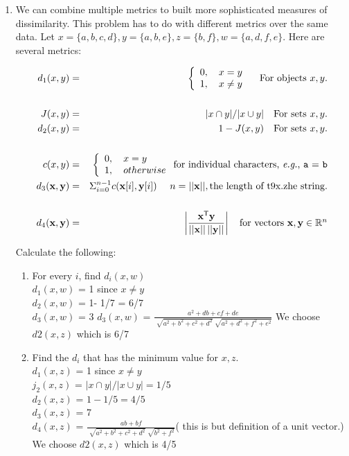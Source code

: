 \documentclass{article}
\begin{document}
\begin{enumerate}
\item  We can combine multiple metrics to built more sophisticated measures of dissimilarity. This problem has to do with different metrics over the same data.  Let  $x = \{a,b,c,d\}, y = \{a, b, e\}, z = \{b, f\}, w = \{a,d,f,e\}$.  Here are several metrics:

 \begin{eqnarray*}
 d_1(x,y) &=& \left\{\begin{array}{l} 0,\ \ \ x = y \\ 1,\ \ \  x\neq y \end{array}\right.\ \ \ \mbox{For objects $x,y$}. \\
 &&\\
 J(x,y) &=&|x \cap y|/|x \cup y|\ \ \ \mbox{\rm For sets $x,y$.} \\   d_2(x,y) &=& 1-J(x,y)\ \ \ \mbox{\rm For sets $x,y$.}\\
 &&\\
c(x,y) &=& \left\{\begin{array}{l}0, \ \ \ x = y\\ 1, \ \ \ otherwise\end{array}\right. \mbox{\rm for individual characters, {\it e.g.}, \texttt{a} = \texttt{b}}\\
d_3(\mathrm{\bf x},\mathrm{\bf y}) &=& \Sigma_{i=0}^{n-1}c(\mathrm{\bf x}[i], \mathrm{\bf y}[i]) \ \ \ \ n = ||\mathrm{\bf x}||, \mbox{\rm the length of t9x.zhe string.}\\
&&\\
d_4(\mathbf{x},\mathbf{y}) &=& \left|{\frac{\mathbf{x}^{\mathsf{T}}\mathbf{y}}{||\mathbf{x}||\,||\mathbf{y}||}}\right| \ \ \ \mbox{\rm for vectors $\mathbf{x}, \mathbf{y} \in \mathbb{R}^n$} 
 \end{eqnarray*}

Calculate the following:
\begin{enumerate} \item For every $i$, find $d_i(x,w)$  \\
$d_1(x,w)$ = 1 since $x \neq y$ \\
$d_2(x,w)$ = 1- 1/7 = 6/7 \\
$d_3(x,w)$ = 3
$d_3(x,w)$ = $\frac{a^2+db+cf+de}{\sqrt[]{a^2+b^2+c^2+d^2}\sqrt[]{a^2+d^2+f^2+e^2}}$
We choose $d2(x,z)$ which is 6/7
\item Find the $d_i$ that has the minimum value for $x,z$.   \\
$d_1(x,z)$ = 1 since $x \neq y$ \\ 
$j_2(x,z)$ = $|x \cap y|/|x \cup y| = 1/5$ \\
$d_2(x,z)$ = $1-1/5 = 4/5$ \\
$d_3(x,z)$ = 7 \\ 
$d_4(x,z)$ =  $\frac{ab+bf}{\sqrt[]{a^2+b^2+c^2+d^2}\sqrt[]{b^2+f^2}}$( this is but definition of a unit vector.) \\
We choose $d2(x,z)$ which is 4/5


\end{enumerate}
\end{enumerate}
\end{document}
